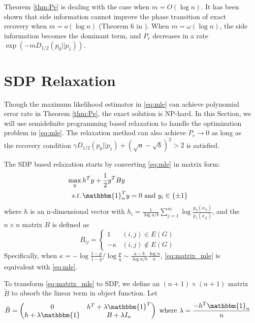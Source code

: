 \documentclass[conference]{IEEEtran}
\begin{document}
	Theorem \ref{thm:Pe} is dealing with the case when $m=O(\log n)$. It has been shown
	that side information cannot improve the phase transition of exact recovery when $m=o(\log n)$ (Theorem 6 in \cite{saad2018community}). When $m=\omega(\log n)$,
	the side information becomes the dominant term, and $P_e$ decreases in a rate $\exp(-m D_{1/2}(p_0||p_1) )$.
	
	\section{SDP Relaxation}
	Though the maximum likelihood estimator in \eqref{eq:mle} can achieve polynomial
	error rate in Theorem \ref{thm:Pe}, the exact solution is NP-hard. In this
	Section, we will use semidefinite programming based relaxation to handle
	the optimization problem in \eqref{eq:mle}. The relaxation method
	can also achieve $P_e\to 0$ as long as the recovery condition
	$\gamma D_{1/2}(p_0||p_1) + (\sqrt{a} - \sqrt{b})^2 > 2$ is satisfied.
	
	The SDP based relaxation starts by converting \eqref{eq:mle} in matrix form:
	\begin{align}
	\max_{y}\, & h^T y + \frac{1}{2}y^T B y \notag \\
	s.t.\, & \mathbbm{1}_n^T y = 0 \text{ and } y_i \in \{\pm 1 \} \label{eq:matrix_mle}
	\end{align}
	where $h$ is an n-dimensional vector with $h_i = \frac{1}{\log a/b}\sum_{j=1}^m \log \frac{p_0(x_{ij})}{p_1(x_{ij})}$, and the $n\times n $ matrix $B$ is defined as
	\begin{equation}
	B_{ij} = \begin{cases}
	1 & (i,j)\in E(G) \\
	-\kappa & (i,j) \not\in E(G)
	\end{cases}
	\end{equation}
	Specifically, when $\kappa = -\log\frac{1-p}{1-q} / \log\frac{p}{q} \sim \frac{a-b}{\log a/b}\frac{\log n}{n}$, \eqref{eq:matrix_mle} is equivalent with \eqref{eq:mle}. 
	
	To transform \eqref{eq:matrix_mle} to SDP, we define an $(n+1) \times (n+1)$ matrix $\widetilde{B}$
	to absorb the linear term in object function.
	Let 
	\begin{equation}
	\tilde{B} = \begin{pmatrix} 0 & h^T + \lambda \mathbbm{1}^T \\ h + \lambda \mathbbm{1} & B + \lambda I_n \end{pmatrix}
	\textrm{ where } \lambda = \frac{-h^T \mathbbm{1}_n}{n} 
	\end{equation}
	
\end{document}
